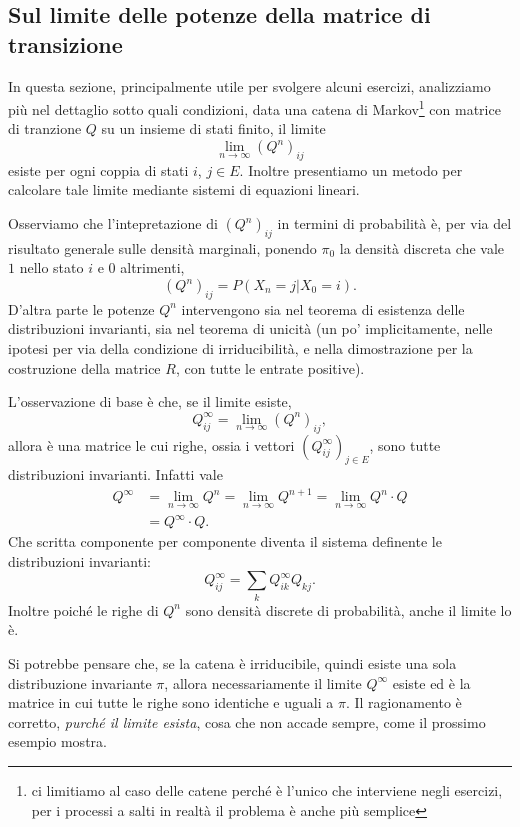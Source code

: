 \documentclass[
  italian,
  letterpaper,
]{book}
\theoremstyle{definition}
\theoremstyle{remark}
\begin{document}
\subsection{Sul limite delle potenze della matrice di
transizione}\label{sul-limite-delle-potenze-della-matrice-di-transizione}

In questa sezione, principalmente utile per svolgere alcuni esercizi,
analizziamo più nel dettaglio sotto quali condizioni, data una catena di
Markov\footnote{ci limitiamo al caso delle catene perché è l'unico che
  interviene negli esercizi, per i processi a salti in realtà il
  problema è anche più semplice} con matrice di tranzione \(Q\) su un
insieme di stati finito, il limite \[ \lim_{n \to \infty} (Q^n)_{ij}\]
esiste per ogni coppia di stati \(i\), \(j \in E\). Inoltre presentiamo
un metodo per calcolare tale limite mediante sistemi di equazioni
lineari.

Osserviamo che l'intepretazione di \((Q^n)_{ij}\) in termini di
probabilità è, per via del risultato generale sulle densità marginali,
ponendo \(\pi_0\) la densità discreta che vale \(1\) nello stato \(i\) e
\(0\) altrimenti, \[ (Q^n)_{ij} = P(X_n = j | X_0 =i).\] D'altra parte
le potenze \(Q^n\) intervengono sia nel teorema di esistenza delle
distribuzioni invarianti, sia nel teorema di unicità (un po'
implicitamente, nelle ipotesi per via della condizione di
irriducibilità, e nella dimostrazione per la costruzione della matrice
\(R\), con tutte le entrate positive).

L'osservazione di base è che, se il limite esiste,
\[ Q^\infty_{ij} = \lim_{n \to \infty} (Q^n)_{ij},\] allora è una
matrice le cui righe, ossia i vettori \((Q^\infty_{ij})_{j \in E}\),
sono tutte distribuzioni invarianti. Infatti vale
\[ \begin{split} Q^\infty & = \lim_{n \to \infty }Q^n = \lim_{n \to \infty } Q^{n+1} = \lim_{n \to \infty }Q^n \cdot Q\\
& = Q^\infty\cdot  Q.\end{split}\] Che scritta componente per componente
diventa il sistema definente le distribuzioni invarianti:
\[ Q^\infty_{ij} = \sum_{k} Q^{\infty}_{ik} Q_{k j}.\] Inoltre poiché le
righe di \(Q^n\) sono densità discrete di probabilità, anche il limite
lo è.

Si potrebbe pensare che, se la catena è irriducibile, quindi esiste una
sola distribuzione invariante \(\pi\), allora necessariamente il limite
\(Q^\infty\) esiste ed è la matrice in cui tutte le righe sono identiche
e uguali a \(\pi\). Il ragionamento è corretto, \emph{purché il limite
esista}, cosa che non accade sempre, come il prossimo esempio mostra.
\end{document}
